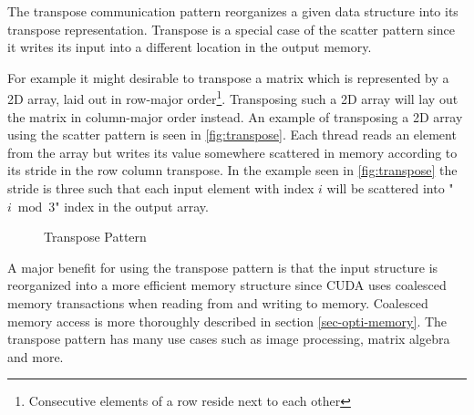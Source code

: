 The transpose communication pattern reorganizes a given data structure into its transpose representation.
Transpose is a special case of the scatter pattern since it writes its input into a different location in the output memory.

For example it might desirable to transpose a matrix which is represented by a 2D array, laid out in row-major order\footnote{Consecutive elements of a row reside next to each other}.
Transposing such a 2D array will lay out the matrix in column-major order instead.
An example of transposing a 2D array using the scatter pattern is seen in \autoref{fig:transpose}.
Each thread reads an element from the array but writes its value somewhere scattered in memory according to its stride in the row column transpose.
In the example seen in \autoref{fig:transpose} the stride is three such that each input element with index $i$ will be scattered into "$i\bmod 3$" index in the output array.
\begin{figure}[ht]
	\centering
	\caption{Transpose Pattern}
	\label{fig:transpose}
\end{figure}
A major benefit for using the transpose pattern is that the input structure is reorganized into a more efficient memory structure since CUDA uses coalesced memory transactions when reading from and writing to memory.
Coalesced memory access is more thoroughly described in section \autoref{sec-opti-memory}.
The transpose pattern has many use cases such as image processing, matrix algebra and more.